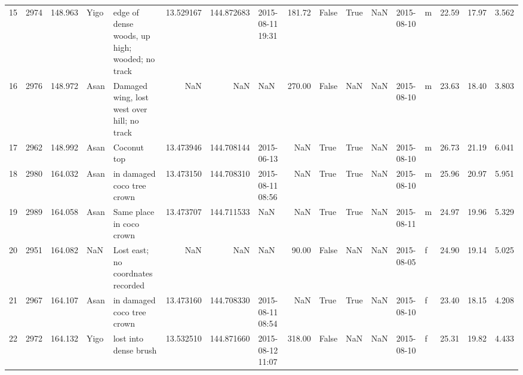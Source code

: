\begin{tabular}{lrrllrrlrlllllrrr}
15 &       2974 &    148.963 &     Yigo &                                         edge of dense woods, up high; wooded; no track &  13.529167 &  144.872683 &     2015-08-11 19:31 &                  181.72 &             False &    True &           NaN &       2015-08-10 &   m &   22.59 &  17.97 &   3.562 \\
16 &       2976 &    148.972 &     Asan &                                            Damaged wing, lost west over hill; no track &        NaN &         NaN &                  NaN &                  270.00 &             False &     NaN &           NaN &       2015-08-10 &   m &   23.63 &  18.40 &   3.803 \\
17 &       2962 &    148.992 &     Asan &                                                                            Coconut top &  13.473946 &  144.708144 &           2015-06-13 &                     NaN &              True &    True &           NaN &       2015-08-10 &   m &   26.73 &  21.19 &   6.041 \\
18 &       2980 &    164.032 &     Asan &                                                             in damaged coco tree crown &  13.473150 &  144.708310 &     2015-08-11 08:56 &                     NaN &              True &    True &           NaN &       2015-08-10 &   m &   25.96 &  20.97 &   5.951 \\
19 &       2989 &    164.058 &     Asan &                                                               Same place in coco crown &  13.473707 &  144.711533 &                  NaN &                     NaN &              True &    True &           NaN &       2015-08-11 &   m &   24.97 &  19.96 &   5.329 \\
20 &       2951 &    164.082 &      NaN &                                                      Lost east; no coordnates recorded &        NaN &         NaN &                  NaN &                   90.00 &             False &     NaN &           NaN &       2015-08-05 &   f &   24.90 &  19.14 &   5.025 \\
21 &       2967 &    164.107 &     Asan &                                                             in damaged coco tree crown &  13.473160 &  144.708330 &     2015-08-11 08:54 &                     NaN &              True &    True &           NaN &       2015-08-10 &   f &   23.40 &  18.15 &   4.208 \\
22 &       2972 &    164.132 &     Yigo &                                                                  lost into dense brush &  13.532510 &  144.871660 &     2015-08-12 11:07 &                  318.00 &             False &     NaN &           NaN &       2015-08-10 &   f &   25.31 &  19.82 &   4.433 \\

\end{tabular}
